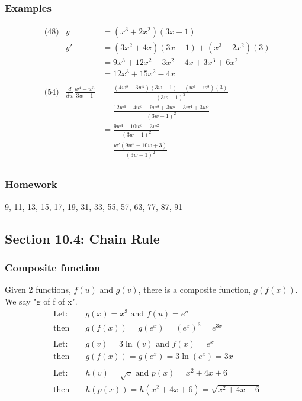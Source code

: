 \documentclass[14pt]{extarticle}
\begin{document}
\subsubsection*{Examples}
\begin{align*}
	&\text{(48)} &y &= (x^3 + 2x^2)(3x-1) \\
	&			&y' &= (3x^2 + 4x)(3x -1) + (x^3 + 2x^2)(3) \\
	&			&    &= 9x^3 + 12x^2 - 3x^2 -4x + 3x^3 +6x^2 \\
	&			&    &= 12x^3 + 15x^2 - 4x\\\\
	&\text{(54)} &\frac{d}{dw} \frac{w^4 - w^3}{3w-1}&= \frac{(4w^3 - 3w^2)(3w-1) - (w^4 - w^3)(3)}{(3w-1)^2} \\
	&	&		&= \frac{12w^4- 4w^3 - 9w^3 + 3w^2 - 3w^4 + 3w^3}{(3w-1)^2} \\
	&	&		&=\frac{9w^4- 10w^3 + 3w^2 }{(3w-1)^2} \\
	&	&		&=\frac{w^2(9w^2- 10w + 3) }{(3w-1)^2} \\
\end{align*}

\subsubsection*{Homework}
9, 11, 13, 15, 17, 19, 31, 33, 55, 57, 63, 77, 87, 91

\subsection{Section 10.4: Chain Rule}
\subsubsection*{Composite function}
Given 2 functions, $f(u)$ and $g(v)$, there is a composite function, $g(f(x))$. We say "g of f of x".
\begin{align*}
	&\text{Let:} & &g(x) = x^3 \text{ and } f(u) = e^u \\
	&\text{then } & &g(f(x)) = g(e^x) = (e^x)^3 = e^{3x}
\\\\
	&\text{Let:} & &g(v) = 3\ln(v) \text{ and } f(x) = e^x \\
	&\text{then } & &g(f(x)) = g(e^x) = 3\ln(e^x) = 3x
\\\\
	&\text{Let:} & &h(v) = \sqrt{v} \text{ and } p(x) = x^2 + 4x + 6 \\
	&\text{then } & &h(p(x)) = h(x^2 + 4x + 6) = \sqrt{x^2 + 4x + 6}
\end{align*}
\end{document}
